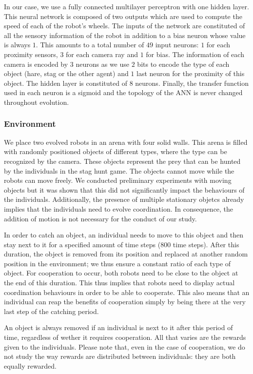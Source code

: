     In our case, we use a fully connected multilayer perceptron with one hidden layer. This neural network is composed of two outputs which are used to compute the speed of each of the robot's wheels. The inputs of the network are constituted of all the sensory information of the robot in addition to a bias neuron whose value is always $1$. This amounts to a total number of $49$ input neurons: $1$ for each proximity sensors, $3$ for each camera ray and $1$ for bias. The information of each camera is encoded by $3$ neurons as we use $2$ bits to encode the type of each object (hare, stag or the other agent) and $1$ last neuron for the proximity of this object. The hidden layer is constituted of $8$ neurons. Finally, the transfer function used in each neuron is a sigmoid and the topology of the ANN is never changed throughout evolution.

    \subsubsection{Environment} We place two evolved robots in an arena with four solid walls. This arena is filled with randomly positioned objects of different types, where the type can be recognized by the camera. These objects represent the prey that can be hunted by the individuals in the stag hunt game. The objects cannot move while the robots can move freely. We conducted preliminary experiments with moving objects but it was shown that this did not significantly impact the behaviours of the individuals. Additionally, the presence of multiple stationary objetcs already implies that the individuals need to evolve coordination. In consequence, the addition of motion is not necessary for the conduct of our study.

    In order to catch an object, an individual needs to move to this object and then stay next to it for a specified amount of time steps ($800$ time steps). After this duration, the object is removed from its position and replaced at another random position in the environment; we thus ensure a constant ratio of each type of object. For cooperation to occur, both robots need to be close to the object at the end of this duration. This thus implies that robots need to display actual coordination behaviours in order to be able to cooperate. This also means that an individual can reap the benefits of cooperation simply by being there at the very last step of the catching period.

    An object is always removed if an individual is next to it after this period of time, regardless of wether it requires cooperation. All that varies are the rewards given to the individuals. Please note that, even in the case of cooperation, we do not study the way rewards are distributed between individuals: they are both equally rewarded.

